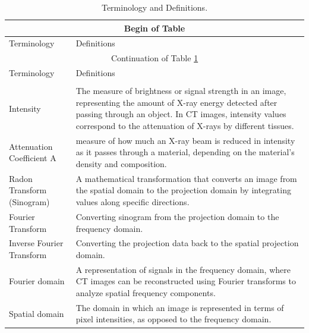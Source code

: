 \documentclass[12pt]{article}
\begin{document}
\begin{center}
\begin{longtable}{|l|p{10cm}|}
  \caption{Terminology and Definitions.\label{long}}\\

\hline
 \multicolumn{2}{|c|}{Begin of Table}\\
 \hline
 Terminology & Definitions\\
 \hline
 \endfirsthead

 \hline
 \multicolumn{2}{|c|}{Continuation of Table \ref{long}}\\
 \hline
 Terminology & Definitions\\
 \hline
 \endhead

 \hline
 \endfoot

 \hline
 \multicolumn{2}{| c |}{End of Table}\\
 \hline\hline
 \endlastfoot

  Intensity & The measure of brightness or signal strength in an image, representing the amount of X-ray energy detected after passing through an object. In CT images, intensity values correspond to the attenuation of X-rays by different tissues.\\
  \hline

  Attenuation Coefficient A&  measure of how much an X-ray beam is reduced in intensity as it passes through a material, depending on the material's density and composition.\\
  \hline

  Radon Transform (Sinogram) & A mathematical transformation that converts an image from the spatial domain to the projection domain by integrating values along specific directions.\\
  \hline

  Fourier Transform & Converting sinogram from the projection domain to the frequency domain.\\
  \hline

  Inverse Fourier Transform & Converting the projection data back to the spatial projection domain.\\
  \hline

  Fourier domain & A representation of signals in the frequency domain, where CT images can be reconstructed using Fourier transforms to analyze spatial frequency components.\\
  \hline

  Spatial domain & The domain in which an image is represented in terms of pixel intensities, as opposed to the frequency domain.\\
  \hline


\end{longtable}
\end{center}
\end{document}
